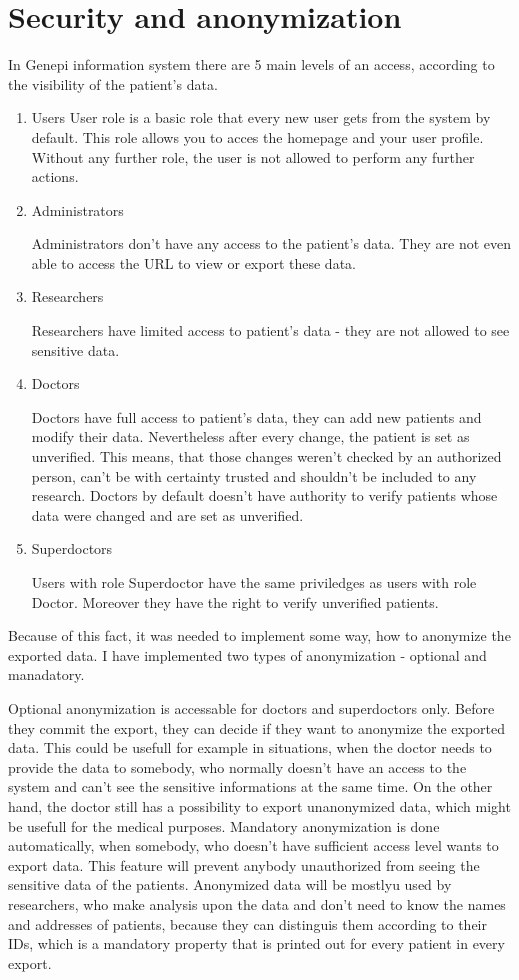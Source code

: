 \documentclass[thesis=B,english]{FITthesis}[2012/10/20]
\begin{document}
\section{Security and anonymization}
In Genepi information system there are 5 main levels of an access, according to the visibility of the patient's data.
\begin{enumerate}
\item{Users}
User role is a basic role that every new user gets from the system by default. This role allows you to acces the homepage and your user profile. Without any further role, the user is not allowed to perform any further actions.

\item{Administrators}

Administrators don't have any access to the patient's data. They are not even able to access the URL to view or export these data.
\item{Researchers}

Researchers have limited access to patient's data - they are not allowed to see sensitive data.
\item{Doctors}

Doctors have full access to patient's data, they can add new patients and modify their data. Nevertheless after every change, the patient is set as unverified. This means, that those changes weren't checked by an authorized person, can't be with certainty trusted and shouldn't be included to any research. Doctors by default doesn't have authority to verify patients whose data were changed and are set as unverified.

\item{Superdoctors}

Users with role Superdoctor have the same priviledges as users with role Doctor. Moreover they have the right to verify unverified patients.

\end{enumerate}
Because of this fact, it was needed to implement some way, how to anonymize the exported data. I have implemented two types of anonymization - optional and manadatory.

Optional anonymization is accessable for doctors and superdoctors only. Before they commit the export, they can decide if they want to anonymize the exported data. This could be usefull for example in situations, when the doctor needs to provide the data to somebody, who normally doesn't have an access to the system and can't see the sensitive informations at the same time. On the other hand, the doctor still has a possibility to export unanonymized data, which might be usefull for the medical purposes.
Mandatory anonymization is done automatically, when somebody, who doesn't have sufficient access level wants to export data. This feature will prevent anybody unauthorized from seeing the sensitive data of the patients. Anonymized data will be mostlyu used by researchers, who make analysis upon the data and don't need to know the names and addresses of patients, because they can distinguis them according to their IDs, which is a mandatory property that is printed out for every patient in every export.
\end{document}
